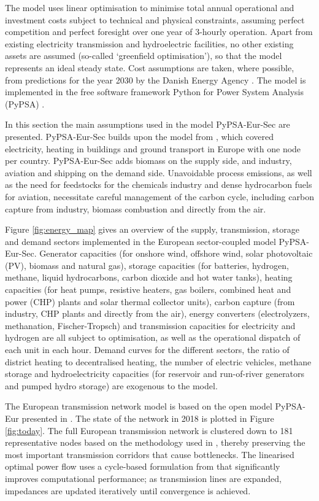 The model uses linear optimisation to minimise total annual operational and
investment costs subject to technical and physical constraints, assuming perfect
competition and perfect foresight over one year of 3-hourly operation. Apart
from existing electricity transmission and hydroelectric facilities, no other
existing assets are assumed (so-called `greenfield optimisation'), so that the
model represents an ideal steady state.  Cost assumptions are taken, where
possible, from predictions for the year 2030 by the Danish Energy Agency
\cite{dea2019}. The model is implemented in the free software framework Python
for Power System Analysis (PyPSA) \cite{PyPSA}.

In this section the main assumptions used in the model PyPSA-Eur-Sec are
presented. PyPSA-Eur-Sec builds upon the model from \cite{brown2018}, which
covered electricity, heating in buildings and ground transport in Europe with
one node per country. PyPSA-Eur-Sec adds biomass on the supply side, and
industry, aviation and shipping on the demand side. Unavoidable process
emissions, as well as the need for feedstocks for the chemicals industry and
dense hydrocarbon fuels for aviation, necessitate careful management of the
carbon cycle, including carbon capture from industry, biomass combustion and
directly from the air.

Figure \ref{fig:energy_map} gives an overview of the supply, transmission,
storage and demand sectors implemented in the European sector-coupled model
PyPSA-Eur-Sec. Generator capacities (for onshore wind, offshore wind, solar
photovoltaic (PV), biomass and natural gas), storage capacities (for batteries,
hydrogen, methane, liquid hydrocarbons, carbon dioxide and hot water tanks),
heating capacities (for heat pumps, resistive heaters, gas boilers, combined
heat and power (CHP) plants and solar thermal collector units), carbon capture
(from industry, CHP plants and directly from the air), energy converters
(electrolyzers, methanation, Fischer-Tropsch) and transmission capacities for
electricity and hydrogen are all subject to optimisation, as well as the
operational dispatch of each unit in each hour. Demand curves for the different
sectors, the ratio of district heating to decentralised heating, the number of
electric vehicles, methane storage and hydroelectricity capacities (for
reservoir and run-of-river generators and pumped hydro storage) are exogenous to
the model.

The European transmission network model is based on the open model PyPSA-Eur
presented in \cite{HORSCH2018207}. The state of the network in 2018 is plotted
in Figure \ref{fig:today}. The full European transmission network is clustered
down to 181 representative nodes based on the methodology used in
\cite{Hoersch2017}, thereby preserving the most important transmission corridors
that cause bottlenecks. The linearised optimal power flow uses a cycle-based
formulation from \cite{HORSCH2018126} that significantly improves computational
performance; as transmission lines are expanded, impedances are updated
iteratively until convergence is achieved.

